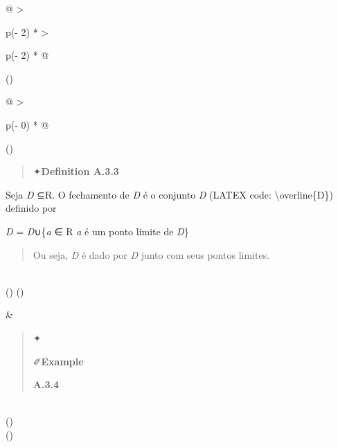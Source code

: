 \documentclass[
]{article}
\begin{document}
\begin{longtable}[]{@{}
  >{\raggedright\arraybackslash}p{(\columnwidth - 2\tabcolsep) * }
  >{\raggedright\arraybackslash}p{(\columnwidth - 2\tabcolsep) * }@{}}
\toprule()
\begin{minipage}[b]{\linewidth}\raggedright
\begin{longtable}[]{@{}
  >{\raggedright\arraybackslash}p{(\columnwidth - 0\tabcolsep) * }@{}}
\toprule()
\begin{minipage}[b]{\linewidth}\raggedright
\begin{quote}
✦\textbf{Definition A.3.3}
\end{quote}

Seja \emph{D} ⊆R. O fechamento de \emph{D} é o conjunto \emph{D} (LATEX
code: \textbackslash overline\{D\}) definido por

\emph{D} = \emph{D}∪\{\emph{a} ∈ R \textbar{} \emph{a} é um ponto limite
de \emph{D}\}

\begin{quote}
Ou seja, \emph{D} é dado por \emph{D} junto com seus pontos limites.
\end{quote}
\end{minipage} \\
\midrule()
\endhead
\bottomrule()
\end{longtable}
\end{minipage} & \begin{minipage}[b]{\linewidth}\raggedright
\begin{quote}
✦

✐\textbf{Example}

\textbf{A.3.4}
\end{quote}
\end{minipage} \\
\midrule()
\endhead
{} \\
\bottomrule()
\end{longtable}
\end{document}
